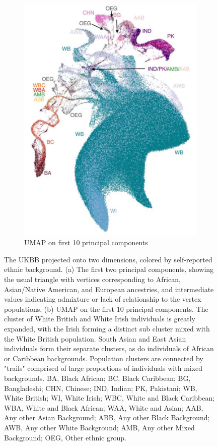 \documentclass[12pt]{pnas-new}
\begin{document}
\begin{figure}
\begin{subfigure}{.5\columnwidth}
\includegraphics[width=\columnwidth]{images/UKBB_UMAP_PC10_NN15_MD05_eth_labels.pdf}%
\caption{UMAP on first 10 principal components}%
\label{fig:umap_ukbb_pc10}%
\end{subfigure}%
\caption{The UKBB projected onto two dimensions, colored by self-reported ethnic background. (a) The first two principal components, showing the usual triangle with vertices corresponding to African, Asian/Native American, and European ancestries, and intermediate values indicating admixture or lack of relationship to the vertex populations. (b) UMAP on the first 10 principal components. The cluster of White British and White Irish individuals is greatly expanded, with the Irish forming a distinct sub cluster mixed with the White British population. South Asian and East Asian individuals form their separate clusters, as do individuals of African or Caribbean backgrounds. Population clusters are connected by "trails" comprised of large proportions of individuals with mixed backgrounds.
BA, Black African; 
BC, Black Caribbean; 
BG, Bangladeshi; 
CHN, Chinese; 
IND, Indian;
PK, Pakistani;
WB, White British;
WI, White Irish;
WBC, White and Black Caribbean; 
WBA, White and Black African; 
WAA, White and Asian;
AAB, Any other Asian Background; 
ABB, Any other Black Background;
AWB, Any other White Background;
AMB, Any other Mixed Background;
OEG, Other ethnic group. 
}
\label{fig:fig_ukbb}
\end{figure}
\end{document}
